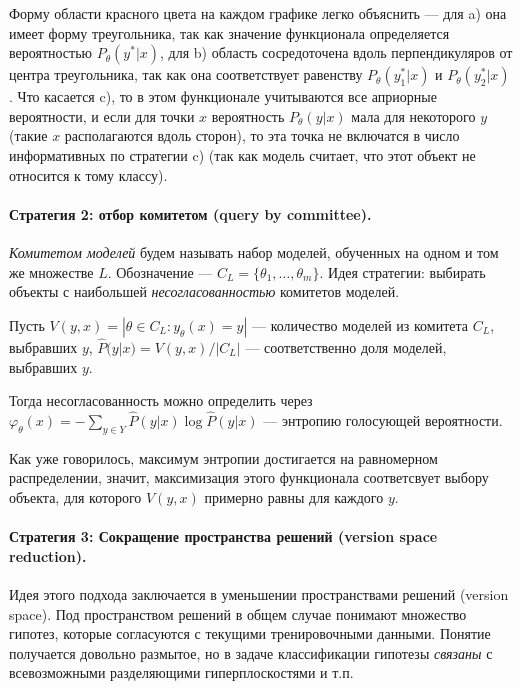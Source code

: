 \documentclass[specialist, 12pt, href]{article}
\begin{document}
Форму области красного цвета на каждом графике легко объяснить --- для
a) она имеет форму треугольника, так как значение функционала
определяется вероятностью \(P_{\theta}(y^*|x)\), для b) область
сосредоточена вдоль перпендикуляров от центра треугольника, так как она
соответствует равенству \(P_{\theta}(y^*_1|x)\) и
\(P_{\theta}(y^*_2|x)\). Что касается c), то в этом функционале
учитываются все априорные вероятности, и если для точки \(x\)
вероятность \(P_{\theta}(y|x)\) мала для некоторого \(y\) (такие \(x\)
располагаются вдоль сторон), то эта точка не включатся в число
информативных по стратегии c) (так как модель считает, что этот объект
не относится к тому классу).

\paragraph{Стратегия 2: отбор комитетом (query by
committee).}

\emph{Комитетом моделей} будем называть набор моделей, обученных на
одном и том же множестве \(L\). Обозначение ---
\(C_L = \{\theta_1,\ldots,\theta_m\}\). Идея стратегии: выбирать объекты
с наибольшей \emph{несогласованностью} комитетов моделей.

Пусть
\(V(y, x) = |{\theta \in C_{L}: y_{\theta}(x) = y}|\) --- количество
  моделей из комитета \(C_{L}\), выбравших \(y\),  \(\hat{P}(y|x) = V(y, x) / |C_{L}|\) --- соответственно доля моделей,
  выбравших \(y\).

Тогда несогласованность можно определить через
\(\varphi_{\theta}(x) = - \sum_{y \in Y} \hat{P}(y|x) \log \hat{P}(y|x)\)
--- энтропию голосующей вероятности.

Как уже говорилось, максимум энтропии достигается на равномерном
распределении, значит, максимизация этого функционала соответсвует
выбору объекта, для которого \(V(y, x)\) примерно равны для каждого
\(y\).

\paragraph{Стратегия 3: Сокращение пространства решений (version space
reduction).}

Идея этого подхода заключается в уменьшении пространствами решений
(version space). Под пространством решений в общем случае понимают
множество гипотез, которые согласуются с текущими тренировочными
данными. Понятие получается довольно размытое, но в задаче классификации
гипотезы \emph{связаны} с всевозможными разделяющими гиперплоскостями и
т.п.
\end{document}

